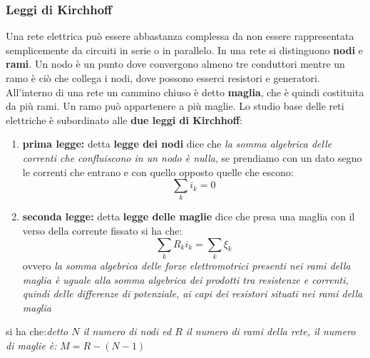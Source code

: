 \documentclass[a4paper,12pt, oneside]{book}
\begin{document}
\subsubsection{Leggi di Kirchhoff}
Una rete elettrica può essere abbastanza complessa da non essere rappresentata semplicemente da circuiti in serie o in parallelo. In una rete si distinguono \textbf{nodi} e \textbf{rami}. Un nodo è un punto dove convergono almeno tre conduttori mentre un ramo è ciò che collega i nodi, dove possono esserci resistori e generatori. All'interno di una rete un cammino chiuso è detto \textbf{maglia}, che è quindi costituita da più rami. Un ramo può appartenere a più maglie. Lo studio base delle reti elettriche è subordinato alle \textbf{due leggi di Kirchhoff}:
\begin{enumerate}
\item \textbf{prima legge:} detta \textbf{legge dei nodi} dice che \textit{la somma algebrica delle correnti che confluiscono in un nodo è nulla}, se prendiamo con un dato segno le correnti che entrano e con quello opposto quelle che escono:
$$\sum_ki_k=0$$
\item \textbf{seconda legge:} detta \textbf{legge delle maglie} dice che presa una maglia con il verso della corrente fissato si ha che:
$$\sum_kR_ki_k=\sum_k\xi_k$$
ovvero \textit{la somma algebrica delle forze elettromotrici presenti nei rami della maglia è uguale alla somma algebrica dei prodotti tra resistenze e correnti, quindi delle differenze di potenziale, ai capi dei resistori situati nei rami della maglia}
\end{enumerate}  
si ha che:\textit{detto $N$ il numero di nodi ed $R$ il numero di rami della rete, il numero di maglie è:} $M=R-(N-1)$
\end{document}
